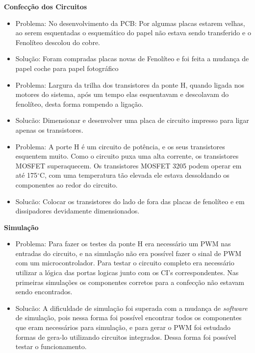 \textbf{Confecção dos Circuitos}

\begin{itemize}

    \item Problema: No desenvolvimento da PCB: Por algumas placas estarem velhas, ao serem esquentadas o esquemático do papel não estava sendo transferido e o Fenolíteo descolou do cobre.
    \item Solução: Foram compradas placas novas de Fenolíteo e foi feita a mudança de papel coche para papel fotográfico

	\item Problema: Largura da trilha dos transistores da ponte H, quando ligada nos motores do sistema, após um tempo elas esquentavam e descolavam do fenolíteo, desta forma rompendo a ligação.
    \item Solucão: Dimensionar e desenvolver uma placa de circuito impresso para ligar apenas os transistores.

    \item Problema: A porte H é um circuito de potência, e os seus transistores esquentem muito. Como o circuito puxa uma alta corrente, os transistores MOSFET superaquecem. Os transistores MOSFET 3205 podem operar em até 175$^{\circ}$C, com uma temperatura tão elevada ele estava dessoldando os componentes ao redor do circuito.
	\item Solucão: Colocar os transistores do lado de fora das placas de fenolíteo e em dissipadores devidamente dimensionados.
\end{itemize}

\textbf{Simulação}

\begin{itemize}

    \item Problema: Para fazer os testes da ponte H era necessário um PWM nas entradas do circuito, e na simulação não era possível fazer o sinal de PWM com um microcontrolador. Para testar o circuito completo era necessário utilizar a lógica das portas logicas junto com os CI’s correspondentes. Nas primeiras simulações os componentes corretos para a confecção não estavam sendo encontrados.
    \item Solucão: A dificuldade de simulação foi superada com a mudança de \textit{software} de simulação, pois nessa forma foi possível encontrar todos os componentes que eram necessários para simulação, e para gerar o PWM foi estudado formas de gera-lo utilizando circuitos integrados. Dessa forma foi possível testar o funcionamento.


\end{itemize}

